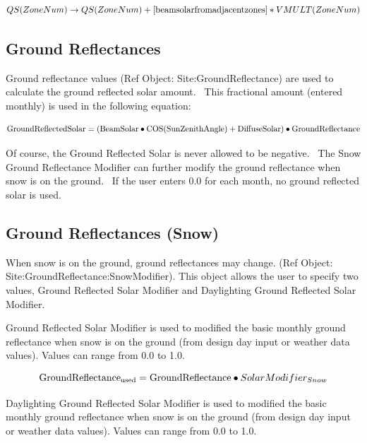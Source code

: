 \begin{equation}
QS(ZoneNum) \to QS(ZoneNum) + [{\rm{beam solar from adjacent zones]}}*VMULT(ZoneNum)
\end{equation}

\subsection{Ground Reflectances}\label{ground-reflectances}

Ground reflectance values (Ref Object: Site:GroundReflectance) are used to calculate the ground reflected solar amount.~ This fractional amount (entered monthly) is used in the following equation:

\begin{equation}
{\rm{GroundReflectedSolar = (BeamSolar}} \bullet {\rm{COS(SunZenithAngle) + DiffuseSolar)}} \bullet {\rm{GroundReflectance}}
\end{equation}

Of course, the Ground Reflected Solar is never allowed to be negative.~ The Snow Ground Reflectance Modifier can further modify the ground reflectance when snow is on the ground.~ If the user enters 0.0 for each month, no ground reflected solar is used.

\subsection{Ground Reflectances (Snow)}\label{ground-reflectances-snow}

When snow is on the ground, ground reflectances may change. (Ref Object: Site:\-Ground\-Re\-flect\-ance:\-Snow\-Modifier). This object allows the user to specify two values, Ground Reflected Solar Modifier and Daylighting Ground Reflected Solar Modifier.

Ground Reflected Solar Modifier is used to modified the basic monthly ground reflectance when snow is on the ground (from design day input or weather data values). Values can range from 0.0 to 1.0.

\begin{equation}
{\rm{GroundReflectanc}}{{\rm{e}}_{{\rm{used}}}} = {\rm{GroundReflectance}} \bullet SolarModifie{r_{Snow}}
\end{equation}

Daylighting Ground Reflected Solar Modifier is used to modified the basic monthly ground reflectance when snow is on the ground (from design day input or weather data values). Values can range from 0.0 to 1.0.

